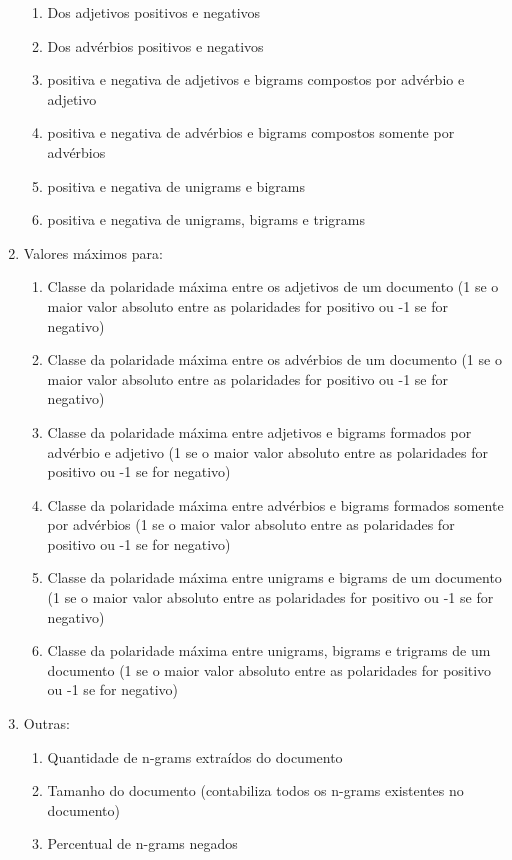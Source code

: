 \documentclass[template.tex]{subfiles}
\begin{document}
\begin{enumerate}
  \begin{enumerate}
     \item Dos adjetivos positivos e negativos
     \item Dos advérbios positivos e negativos
     \item positiva e negativa de adjetivos e bigrams compostos por advérbio e adjetivo
     \item positiva e negativa de advérbios e bigrams compostos somente por advérbios
     \item positiva e negativa de unigrams e bigrams
     \item positiva e negativa de unigrams, bigrams e trigrams
  \end{enumerate}
  \item Valores máximos para:
  \begin{enumerate}
	\item Classe da polaridade máxima entre os adjetivos de um documento (1 se o maior valor absoluto entre as polaridades for positivo ou -1 se for negativo)
	\item Classe da polaridade máxima entre os advérbios de um documento (1 se o maior valor absoluto entre as polaridades for positivo ou -1 se for negativo)
	\item Classe da polaridade máxima entre adjetivos e bigrams formados por advérbio e adjetivo (1 se o maior valor absoluto entre as polaridades for positivo ou -1 se for negativo)
	\item Classe da polaridade máxima entre advérbios e bigrams formados somente por advérbios (1 se o maior valor absoluto entre as polaridades for positivo ou -1 se for negativo)
	\item Classe da polaridade máxima entre unigrams e bigrams de um documento (1 se o maior valor absoluto entre as polaridades for positivo ou -1 se for negativo)
	\item Classe da polaridade máxima entre unigrams, bigrams e trigrams de um documento (1 se o maior valor absoluto entre as polaridades for positivo ou -1 se for negativo)
  \end{enumerate}
  \item Outras:
  \begin{enumerate}
  	\item Quantidade de n-grams extraídos do documento
	\item Tamanho do documento (contabiliza todos os n-grams existentes no documento)
	\item Percentual de n-grams negados
  \end{enumerate}
\end{enumerate}
\end{document}

